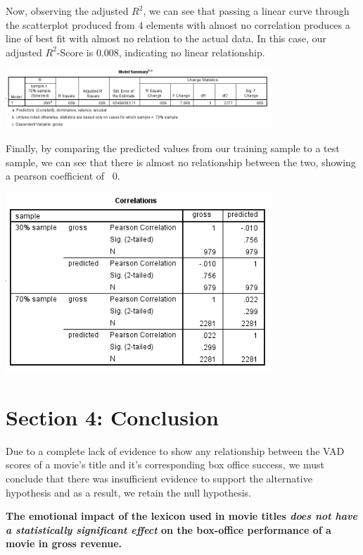 \documentclass[font=10pt]{article}
\begin{document}
Now, observing the adjusted $R^{2}$, we can see that passing a linear curve through the scatterplot produced from 4 elements with almost no correlation produces a line of best fit with almost no relation to the actual data. In this case, our adjusted $R^{2}$-Score is 0.008, indicating no linear relationship.

\begin{center}
	\includegraphics[width=10cm]{summary}
\end{center}

Finally, by comparing the predicted values from our training sample to a test sample, we can see that there is almost no relationship between the two, showing a pearson coefficient of ~0.
\begin{center}
	\includegraphics[width=10cm]{crossvalidation}
\end{center}

\newpage
  \section{Section 4: Conclusion}
Due to a complete lack of evidence to show any relationship between the VAD scores of a movie's title and it's corresponding box office success, we must conclude that there was insufficient evidence to support the alternative hypothesis and as a result, we retain the null hypothesis.

\textbf{The emotional impact of the lexicon used in movie titles \textit{does not have a statistically significant effect} on the box-office performance of a movie in gross revenue.}
\end{document}
